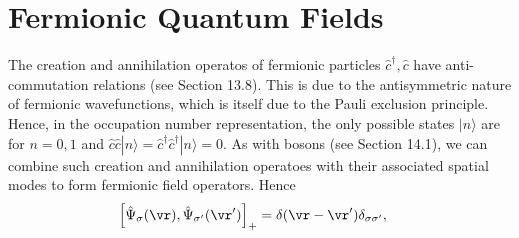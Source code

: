 \documentclass[qo.tex]{subfiles}
\begin{document}
\section{Fermionic Quantum Fields}
The creation and annihilation operatos of fermionic particles $\hat{c}^\dagger,\hat{c}$ have anti-commutation relations (see Section 13.8). 
This is due to the antisymmetric nature of fermionic wavefunctions, which is itself due to the Pauli exclusion principle. 
Hence, in the occupation number representation, the only possible states $|n\rangle$ are for $n=0,1$ and $\hat{c}\hat{c}|n\rangle=\hat{c}^\dagger\hat{c}^\dagger|n\rangle=0$.
As with bosons (see Section 14.1), we can combine such creation and annihilation operatoes with their associated spatial modes to form fermionic field operators. Hence
\begin{align}
    \left[\hat{\Psi}_\sigma(\vr),\hat{\Psi}_{\sigma'}(\vr')\right]_+ &= \delta(\vr-\vr')\delta_{\sigma\sigma'},
\end{align} 
\end{document}
